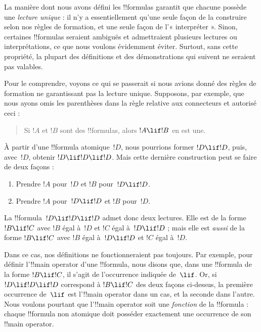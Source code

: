 \documentclass[../../../include/open-logic-section]{subfiles}
\begin{document}


\begin{explain}
La manière dont nous avons défini les !!{formula}s garantit que
chacune possède une \emph{lecture unique} : il n'y a essentiellement
qu'une seule façon de la construire selon nos règles de formation,
et une seule façon de l'« interpréter ». Sinon, certaines
!!{formula}s seraient ambiguës et admettraient plusieurs lectures ou
interprétations, ce que nous voulons évidemment éviter. Surtout, sans
cette propriété, la plupart des définitions et des démonstrations qui
suivent ne seraient pas valables.

Pour le comprendre, voyons ce qui se passerait si nous avions donné
des règles de formation ne garantissant pas la lecture unique.
Supposons, par exemple, que nous ayons omis les parenthèses dans la
règle relative aux connecteurs et autorisé ceci :
\begin{quote}
Si $!A$ et $!B$ sont des !!{formula}s, alors $!A \lif !B$ en est une.
\end{quote}
À partir d'une !!{formula} atomique~$!D$, nous pourrions former
$!D \lif !D$, puis, avec~$!D$, obtenir $!D \lif !D \lif !D$. Mais
cette dernière construction peut se faire de deux façons :
\begin{enumerate}
\item Prendre $!A$ pour~$!D$ et $!B$ pour~$!D \lif !D$.
\item Prendre $!A$ pour~$!D \lif !D$ et $!B$ pour~$!D$.
\end{enumerate}
La !!{formula}~$!D \lif !D \lif !D$ admet donc deux lectures.
Elle est de la forme $!B \lif !C$ avec $!B$ égal à~$!D$ et $!C$
égal à~$!D \lif !D$ ; mais elle est \emph{aussi} de la forme
$!B \lif !C$
avec $!B$ égal à~$!D \lif !D$ et $!C$ égal à~$!D$.

Dans ce cas, nos définitions ne fonctionneraient pas toujours. Par
exemple, pour définir l'!!{main operator} d'une !!{formula}, nous
disons que, dans une !!{formula} de la forme $!B \lif !C$, il s'agit
de l'occurrence indiquée de~$\lif$. Or, si $!D \lif !D \lif !D$
correspond à $!B \lif !C$ des deux façons ci-dessus, la première
occurrence de~$\lif$ est l'!!{main operator} dans un cas, et la
seconde dans l'autre. Nous voulons pourtant que l'!!{main operator}
soit une \emph{fonction} de la !!{formula} : chaque !!{formula} non
atomique doit posséder exactement une occurrence de son !!{main operator}.
\end{explain}
\end{document}
